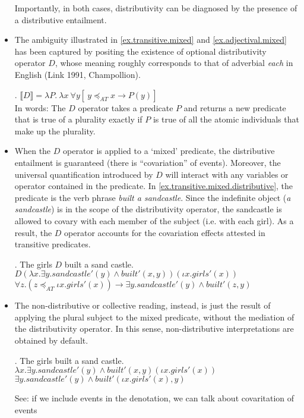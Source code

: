 \documentclass[a4paper]{article}
\newcommand{\addMM}[1]{{\leavevmode\color{red}#1}}
\begin{document}
\begin{itemize}
Importantly, in both cases, distributivity can be diagnosed by the presence of a distributive entailment. 

\item The ambiguity illustrated in \ref{ex.transitive.mixed} and \ref{ex.adjectival.mixed} has been captured by positing the existence of optional distributivity operator $D$, whose meaning roughly corresponds to that of adverbial \textit{each} in English (Link 1991, Champollion). 

\ex. $ \llbracket D \rrbracket = \lambda P.  \ \lambda x \ \forall y[\ y \preceq_{AT} x \rightarrow P(y)]$ \\
In words: The $D$ operator takes a predicate $P$ and returns a new predicate that is true of a plurality exactly if $P$ is true of all the atomic individuals that make up the plurality. 

\item When the $D$ operator is applied to a `mixed' predicate, the distributive entailment is guaranteed \addMM{(there is ``covariation'' of events)}. Moreover, the universal quantification introduced by $D$ will interact with any variables or operator contained in the predicate. In \ref{ex.transitive.mixed.distributive}, the predicate is the verb phrase \textit{built a sandcastle}. Since the indefinite object (\textit{a sandcastle}) is in the scope of the distributivity operator, the sandcastle is allowed to covary with each member of the subject (i.e. with each girl). 
As a result, the $D$ operator accounts for the covariation effects attested in transitive predicates. 

\ex. The girls $D$ built a sand castle.\label{ex.transitive.mixed.distributive} \\ 
    $D(\lambda x.\exists y.\mathit{sandcastle}'(y) \wedge \textit{built}'(x,y))(\iota x.\mathit{girls}'(x))$\\
    $\forall z . (z\preceq_{AT}\iota x.\mathit{girls}'(x)) \rightarrow \exists y.\mathit{sand castle}'(y) \wedge \textit{built}'(z,y)$

\item  The non-distributive or collective reading, instead, is just the result of applying the plural subject to the mixed predicate, without the mediation of the distributivity operator. In this sense, non-distributive interpretations are obtained by default. 

\ex. The girls built a sand castle.\\
    $\lambda x.\exists y.\mathit{sand castle}'(y) \wedge \textit{built}'(x,y)(\iota x.\mathit{girls}'(x))$\\
        $\exists y.\mathit{sandcastle}'(y) \wedge \textit{built}'(\iota x.\mathit{girls}'(x),y)$


\addMM{See: if we include events in the denotation, we can talk about covaritation of events }


\end{itemize}
\end{document}

